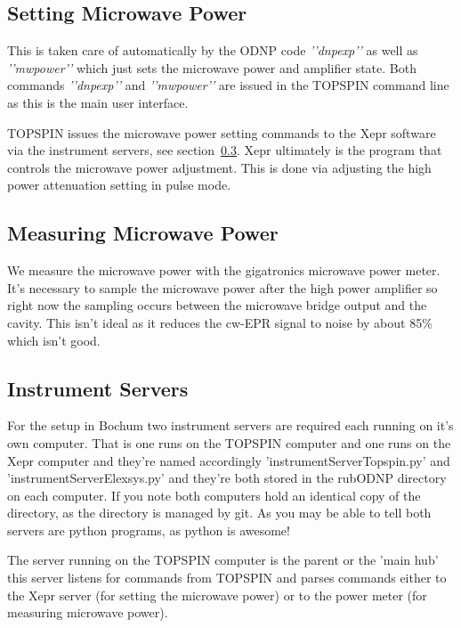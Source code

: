 \documentclass{article}
\newcommand{\fc}[1]{{\color{blue}\textit{'{#1}'}}}
\begin{document}
\subsection{Setting Microwave Power}
\label{sec:micPower}
This is taken care of automatically by the ODNP code \fc{'dnpexp'} as well as \fc{'mwpower'} which just sets the microwave power and amplifier state. Both commands \fc{'dnpexp'} and \fc{'mwpower'} are issued in the TOPSPIN command line as this is the main user interface.

TOPSPIN issues the microwave power setting commands to the Xepr software via the instrument servers, see section~\ref{sec:instServer}. Xepr ultimately is the program that controls the microwave power adjustment. This is done via adjusting the high power attenuation setting in pulse mode.



\subsection{Measuring Microwave Power}
\label{sec:measPower}

We measure the microwave power with the gigatronics microwave power meter. It's necessary to sample the microwave power after the high power amplifier so right now the sampling occurs between the microwave bridge output and the cavity. This isn't ideal as it reduces the cw-EPR signal to noise by about 85\% which isn't good.



\subsection{Instrument Servers}
\label{sec:instServer}
For the setup in Bochum two instrument servers are required each running on it's own computer. That is one runs on the TOPSPIN computer and one runs on the Xepr computer and they're named accordingly 'instrumentServerTopspin.py' and 'instrumentServerElexsys.py' and they're both stored in the rubODNP directory on each computer. If you note both computers hold an identical copy of the directory, as the directory is managed by git. As you may be able to tell both servers are python programs, as python is awesome!

The server running on the TOPSPIN computer is the parent or the 'main hub' this server listens for commands from TOPSPIN and parses commands either to the Xepr server (for setting the microwave power) or to the power meter (for measuring microwave power).
\end{document}
